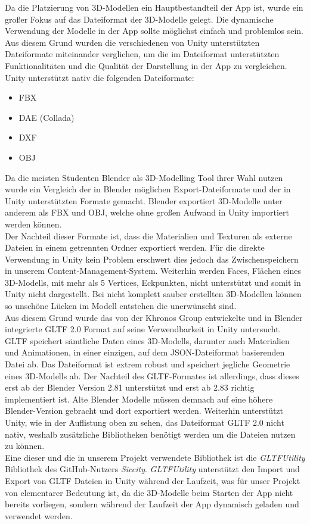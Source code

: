 \documentclass[titlepage, a4paper, 11pt]{scrartcl}
\begin{document}
    Da die Platzierung von 3D-Modellen ein Hauptbestandteil der App ist, wurde ein großer Fokus auf das Dateiformat der 3D-Modelle gelegt. Die dynamische Verwendung der Modelle in der App sollte möglichst einfach und problemlos sein.\\ 
    Aus diesem Grund wurden die verschiedenen von Unity unterstützten Dateiformate miteinander verglichen, um die im Dateiformat unterstützten Funktionalitäten und die Qualität der Darstellung in der App zu vergleichen.\\
    Unity unterstützt nativ die folgenden Dateiformate:
    \begin{itemize}
    \item FBX
    \item DAE (Collada)
    \item DXF
    \item OBJ
    \end{itemize}
    Da die meisten Studenten Blender als 3D-Modelling Tool ihrer Wahl nutzen wurde ein Vergleich der in Blender möglichen Export-Dateiformate und der in Unity unterstützten Formate gemacht. Blender exportiert 3D-Modelle unter anderem als FBX und OBJ, welche ohne großen Aufwand in Unity importiert werden können.\\
    Der Nachteil dieser Formate ist, dass die Materialien und Texturen als externe Dateien in einem getrennten Ordner exportiert werden. Für die direkte Verwendung in Unity kein Problem erschwert dies jedoch das Zwischenspeichern in unserem Content-Management-System. Weiterhin werden \glqq Faces\grqq, Flächen eines 3D-Modells, mit mehr als 5 \glqq Vertices\grqq, Eckpunkten, nicht unterstützt und somit in Unity nicht dargestellt. Bei nicht komplett sauber erstellten 3D-Modellen können so unschöne Lücken im Modell entstehen die unerwünscht sind.\\
    Aus diesem Grund wurde das von der Khronos Group entwickelte und in Blender integrierte GLTF 2.0 Format auf seine Verwendbarkeit in Unity untersucht. GLTF speichert sämtliche Daten eines 3D-Modells, darunter auch Materialien und Animationen, in einer einzigen, auf dem JSON-Dateiformat basierenden Datei ab. Das Dateiformat ist extrem robust und speichert jegliche Geometrie eines 3D-Modells ab. Der Nachteil des GLTF-Formates ist allerdings, dass dieses erst ab der Blender Version 2.81 unterstützt und erst ab 2.83 richtig implementiert ist. Alte Blender Modelle müssen demnach auf eine höhere Blender-Version gebracht und dort exportiert werden. Weiterhin unterstützt Unity, wie in der Auflistung oben zu sehen, das Dateiformat GLTF 2.0 nicht nativ, weshalb zusätzliche Bibliotheken benötigt werden um die Dateien nutzen zu können.\\
    Eine dieser und die in unserem Projekt verwendete Bibliothek ist die \textit{GLTFUtility} Bibliothek des GitHub-Nutzers \textit{Siccity}. \textit{GLTFUtility} unterstützt den Import und Export von GLTF Dateien in Unity während der Laufzeit, was für unser Projekt von elementarer Bedeutung ist, da die 3D-Modelle beim Starten der App nicht bereits vorliegen, sondern während der Laufzeit der App dynamisch geladen und verwendet werden.\\
\end{document}

